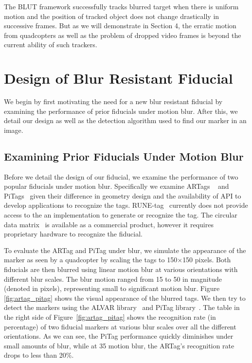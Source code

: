\documentclass[runningheads]{llncs}
\begin{document}
The BLUT framework successfully tracks blurred target when there is uniform motion
and the position of tracked object does not change drastically in successive
frames. But as we will demonstrate in Section 4, the erratic motion from quadcopters as
well as the problem of dropped video frames is beyond the current ability of such trackers.

\section{Design of Blur Resistant Fiducial}

We begin by first motivating the need for a new blur resistant fiducial by examining
the performance of prior fiducials under motion blur.  After this, we detail
our design as well as the detection algorithm used to find our marker in an image.

\subsection{Examining Prior Fiducials Under Motion Blur}\label{sec:blurtest}

Before we detail the design of our fiducial, we examine the performance of two
popular fiducials under motion blur.  Specifically we examine ARTags
~\cite{Fiala05} and PiTags~\cite{Pitag13} given their difference in geometry
design and the availability of API to develop applications to recognize the tags.
RUNE-tag~\cite{runetag11} currently does not provide access to the an
implementation to generate or recognize the tag.  The circular data
matrix~\cite{NaimarkF02} is available as a commercial product, however it
requires proprietary hardware to recognize the fiducial.

To evaluate the ARTag and PiTag under blur, we simulate the appearance of the
marker as seen by a quadcopter by scaling the tags to 150$\times$150 pixels.
Both fiducials are then blurred using linear motion blur at various
orientations with different blur scales. The blur motion ranged from 15 to 50
in magnitude (denoted in pixels), representing small to significant motion
blur. Figure \ref{fig:artag_pitag} shows the visual appearance of the blurred
tags. We then try to detect the markers using the ALVAR library~\cite{alvar} and
PiTag library~\cite{ros_pitag}. The table in the right side of
Figure~\ref{fig:artag_pitag} shows the recognition rate (in percentage) of two
fiducial markers at various blur scales over all the different orientations.
As we can see, the PiTag performance quickly diminishes under small amounts of
blur, while at 35 motion blur, the ARTag's recognition rate drops to less than
20\%.
\end{document}
